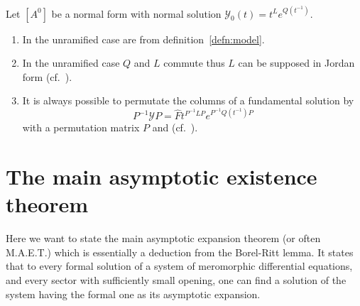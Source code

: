 \begin{rem}
  Let $[A^0]$ be a normal form with normal solution
  $\mathcal{Y}_0(t)=t^L e^{Q(t^{-1})}$.
  \begin{enumerate}
    \item In the unramified case are  from definition~\ref{defn:model}.
    \item In the unramified case $Q$ and $L$ commute thus $L$ can be supposed
      in Jordan form (cf.\ \cite[Sec.4]{Martinet1991}).
    \item It is always possible to permutate the columns of a fundamental
      solution by
      \[
        P^{-1}\mathcal{Y}P=\hat F t^{P^{-1}LP} e^{P^{-1}Q(t^{-1})P}
      \]
      with a permutation matrix $P$ and  (cf.\ \cite[73]{Loday2014}).
  \end{enumerate}
\end{rem}

\section{The main asymptotic existence theorem}
\TODO[move] 
\begin{comment}
  \begin{multicols}{2}
    \textbf{Classical:}
    \begin{itemize}
      \item \cite[Thm.4.4.1]{Loday2014}
      \item \cite[Thm.7.10]{van2003galois}{\tiny\cite[Thm.7.12]{van2003galois}}
      \item \cite[Thm.12.1]{wasow2002asymptotic}
      \item \cite[5.3.Thm.1]{Varadarajan96linearmeromorphic}
      \item \cite[207]{Balser2000Formal}: Some historical remarks
      \item \cite[Thm.A]{BJL1979Birkhoff}
    \end{itemize}
  \columnbreak
    \textbf{Sheafical:}
    \begin{itemize}
      \item \cite[Thm.2.3.1]{sabbah_cimpa90}
      \item \cite[Sec.4.4]{Loday2014}
    \end{itemize}
  \end{multicols}
\end{comment}
Here we want to state the main asymptotic expansion theorem (or often M.A.E.T.)
which is essentially a deduction from the Borel-Ritt lemma.
It states that to every formal solution of a system of meromorphic differential
equations, and every sector with sufficiently small opening, one can find a
solution of the system having the formal one as its asymptotic expansion.

